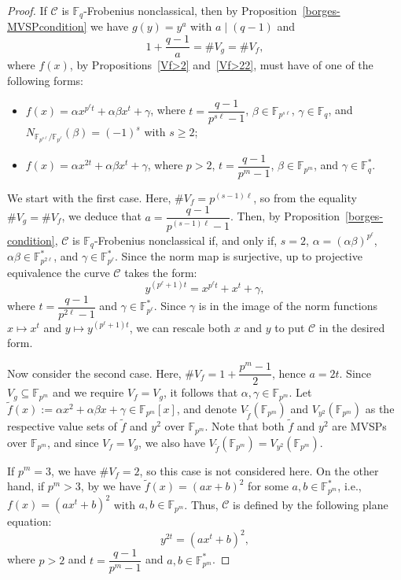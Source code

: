 \documentclass[preprint,12pt]{elsarticle}
\begin{document}
\begin{proof}
If $\mathcal{C}$ is $\mathbb{F}_q$-Frobenius nonclassical, then by Proposition~\ref{borges-MVSPcondition} we have $g(y) = y^a$ with $a \mid (q - 1)$ and 
$$
1 + \frac{q - 1}{a} = \# V_g = \# V_f,
$$ 
where $f(x)$, by Propositions~\ref{Vf>2} and~\ref{Vf>22}, must have of one of the following forms:
\begin{itemize}
    \item $f(x) = \alpha x^{p^{\ell}t} + \alpha \beta x^t + \gamma$, where $t = \dfrac{q - 1}{p^{s\ell} - 1}$, $\beta \in \mathbb{F}_{p^{s\ell}}$, $\gamma \in \mathbb{F}_q$, and $N_{\mathbb{F}_{p^{s\ell}}/\mathbb{F}_{p^{\ell}}}(\beta) = (-1)^s$ with $s \geq 2$;

    \item $f(x) = \alpha x^{2t} + \alpha \beta x^t + \gamma$, where $p > 2$, $t = \dfrac{q - 1}{p^m - 1}$, $\beta \in \mathbb{F}_{p^m}$, and $\gamma \in \mathbb{F}_q^*$.
\end{itemize}

We start with the first case. Here, $\# V_f = p^{(s - 1)\ell}$, so from the equality $\#V_g = \#V_f$, we deduce that $a = \dfrac{q - 1}{p^{(s - 1)\ell} - 1}$. Then, by Proposition~\ref{borges-condition}, $\mathcal{C}$ is $\mathbb{F}_q$-Frobenius nonclassical if, and only if, $s = 2$, $\alpha = (\alpha \beta)^{p^{\ell}}$, $\alpha \beta \in \mathbb{F}_{p^{2\ell}}^*$, and $\gamma \in \mathbb{F}_{p^{\ell}}^*$. Since the norm map is surjective, up to projective equivalence the curve $\mathcal{C}$ takes the form:
$$
y^{(p^{\ell} + 1)t} = x^{p^{\ell}t} + x^t + \gamma,
$$
where $t = \dfrac{q - 1}{p^{2\ell} - 1}$ and $\gamma \in \mathbb{F}_{p^{\ell}}^*$. Since $\gamma$ is in the image of the norm functions $x \mapsto x^t$ and $y \mapsto y^{(p^\ell + 1)t}$, we can rescale both $x$ and $y$ to put $\mathcal{C}$ in the desired form.

Now consider the second case. Here, $\#V_f = 1 + \dfrac{p^m - 1}{2}$, hence $a = 2t$. Since $V_g \subseteq \mathbb{F}_{p^m}$ and we require $V_f = V_g$, it follows that $\alpha, \gamma \in \mathbb{F}_{p^m}$. 
Let $\tilde{f}(x) := \alpha x^2 + \alpha \beta x + \gamma \in \mathbb{F}_{p^m}[x]$, and denote $V_{\tilde{f}}(\mathbb{F}_{p^m})$ and $V_{y^2}(\mathbb{F}_{p^m})$ as the respective value sets of $\tilde{f}$ and $y^2$ over $\mathbb{F}_{p^m}$. Note that both $\tilde{f}$ and $y^2$ are MVSPs over $\mathbb{F}_{p^m}$, and since $V_f = V_g$, we also have $V_{\tilde{f}}(\mathbb{F}_{p^m}) = V_{y^2}(\mathbb{F}_{p^m})$.

If $p^m = 3$, we have $\# V_f = 2$, so this case is not considered here. On the other hand, if $p^m > 3$, by \cite[Lemma 2.6]{borges-separated} we have $\tilde{f}(x) = (ax + b)^2$ for some $a, b \in \mathbb{F}_{p^m}^*$, i.e., $f(x) = (ax^t + b)^2$ with $a,b \in \mathbb{F}_{p^m}$. Thus,  $\mathcal{C}$ is defined by  the following plane equation:
$$
y^{2t} = (ax^t + b)^2,
$$
where $p > 2$ and $t = \dfrac{q - 1}{p^m - 1}$ and $a,b \in \mathbb{F}_{p^m}^*$.
\end{proof}
\end{document}

